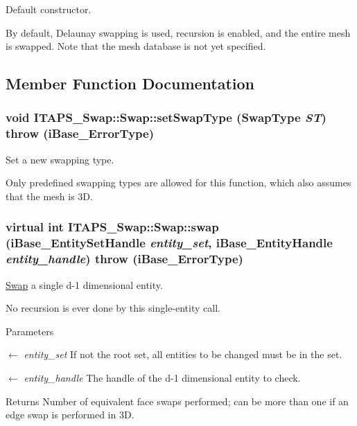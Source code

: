 Default constructor. 

By default, Delaunay swapping is used, recursion is enabled, and the entire mesh is swapped. Note that the mesh database is not yet specified. 

\subsection{Member Function Documentation}
\hypertarget{class_i_t_a_p_s___swap_1_1_swap_a1cfc31d486bf82d7481ce87caec66853}{
\subsubsection[{setSwapType}]{\setlength{\rightskip}{0pt plus 5cm}void ITAPS\_\-Swap::Swap::setSwapType (SwapType {\em ST})  throw (iBase\_\-ErrorType)}}
\label{class_i_t_a_p_s___swap_1_1_swap_a1cfc31d486bf82d7481ce87caec66853}


Set a new swapping type. 

Only predefined swapping types are allowed for this function, which also assumes that the mesh is 3D. \hypertarget{class_i_t_a_p_s___swap_1_1_swap_adfb444f7ade3254ba8fa9ced2ec15e65}{
\subsubsection[{swap}]{\setlength{\rightskip}{0pt plus 5cm}virtual int ITAPS\_\-Swap::Swap::swap (iBase\_\-EntitySetHandle {\em entity\_\-set}, \/  iBase\_\-EntityHandle {\em entity\_\-handle})  throw (iBase\_\-ErrorType)}}
\label{class_i_t_a_p_s___swap_1_1_swap_adfb444f7ade3254ba8fa9ced2ec15e65}


\hyperlink{class_i_t_a_p_s___swap_1_1_swap}{Swap} a single d-\/1 dimensional entity. 

No recursion is ever done by this single-\/entity call.


\begin{DoxyParams}{Parameters}
\item[\mbox{$\leftarrow$} {\em entity\_\-set}]If not the root set, all entities to be changed must be in the set.\item[\mbox{$\leftarrow$} {\em entity\_\-handle}]The handle of the d-\/1 dimensional entity to check.\end{DoxyParams}
\begin{DoxyReturn}{Returns}
Number of equivalent face swaps performed; can be more than one if an edge swap is performed in 3D. 
\end{DoxyReturn}


